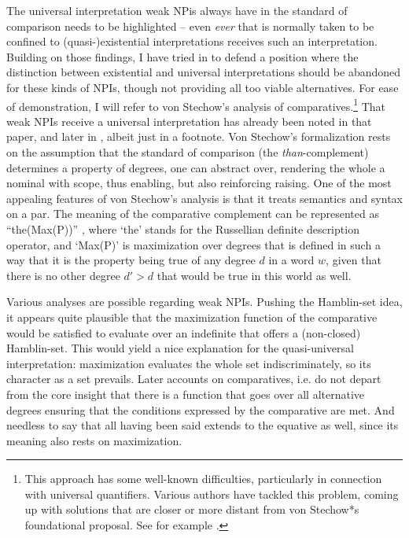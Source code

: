 \documentclass[output=paper,colorlinks,citecolor=brown,
]{langscibook}
\begin{document}
The universal interpretation weak NPis always have in the standard of comparison needs to be highlighted -- even
\textit{ever} that is normally taken to be confined to (quasi-)existential interpretations receives such an interpretation. Building on those findings,
I have tried in \citet{neubarth2017} to defend a position where the distinction between existential and universal
interpretations should be abandoned for these kinds of NPIs, though not providing all too viable alternatives.
For ease of demonstration, I will refer to von Stechow's \citeyearpar{stechow1984} analysis of
comparatives.\footnote{This approach has some well-known difficulties, particularly in connection with universal quantifiers. Various authors have
tackled this problem, coming up with solutions that are closer or more distant from von Stechow*s foundational proposal.
See for example \citet{schwarzschwilk2002,heim2006,beck2010,fleisher2016}.}
That weak NPIs receive a universal interpretation has already been noted in that paper, and later in
\citet{schwarzschwilk2002}, albeit just in a footnote. Von Stechow's formalization rests on the assumption that the standard
of comparison (the \textit{than}-complement) determines a property of degrees, one can abstract over, rendering the
whole a nominal with scope, thus enabling, but also reinforcing raising. One of the most appealing features of von
Stechow's analysis is that it treats semantics and syntax on a par. The meaning of the comparative complement can be
represented as ``the(Max(P))'' \citep[55]{stechow1984}, where `the' stands for the Russellian definite description
operator, and `Max(P)' is maximization over degrees that is defined in such a way that it is the property being true of
any degree $d$ in a word $w$, given that there is no other degree $d' > d$ that would be true in this world as well.

Various analyses are possible regarding weak NPIs. Pushing the Hamblin-set idea, it appears quite plausible that the maximization function
of the comparative would be satisfied to evaluate over an indefinite that offers a (non-closed) Hamblin-set. This would yield a
nice explanation for the quasi-universal interpretation: maximization
evaluates the whole set indiscriminately, so its character as a set prevails. Later accounts on comparatives, i.e.
\citet{stechow1996,heim2000} do not depart from the core insight that there is a function that goes over all
alternative degrees ensuring that the conditions expressed by the comparative are met. And needless to say that all
having been said extends to the equative as well, since its meaning also rests on maximization.
\end{document}
